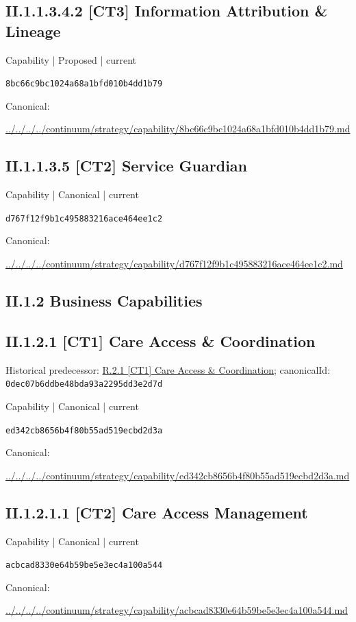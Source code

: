 \documentclass[10pt,a4paper]{article}
\begin{document}
\subsection*{II.1.1.3.4.2 [CT3] Information Attribution \& Lineage}
\label{element-8bc66c9bc1024a68a1bfd010b4dd1b79}
{\small Capability | Proposed | current}\par
\texttt{8bc66c9bc1024a68a1bfd010b4dd1b79}\par
Canonical: \par
{\footnotesize\url{../../../../continuum/strategy/capability/8bc66c9bc1024a68a1bfd010b4dd1b79.md}}\par
\subsection*{II.1.1.3.5 [CT2] Service Guardian}
\label{element-d767f12f9b1c495883216ace464ee1c2}
{\small Capability | Canonical | current}\par
\texttt{d767f12f9b1c495883216ace464ee1c2}\par
Canonical: \par
{\footnotesize\url{../../../../continuum/strategy/capability/d767f12f9b1c495883216ace464ee1c2.md}}\par
\subsection*{II.1.2 Business Capabilities}
\subsection*{II.1.2.1 [CT1] Care Access \& Coordination}
Historical predecessor: \hyperref[element-0dec07b6ddbe48bda93a2295dd3e2d7d]{R.2.1 [CT1] Care Access \& Coordination}; canonicalId: \texttt{0dec07b6ddbe48bda93a2295dd3e2d7d}\par
\label{element-ed342cb8656b4f80b55ad519ecbd2d3a}
{\small Capability | Canonical | current}\par
\texttt{ed342cb8656b4f80b55ad519ecbd2d3a}\par
Canonical: \par
{\footnotesize\url{../../../../continuum/strategy/capability/ed342cb8656b4f80b55ad519ecbd2d3a.md}}\par
\subsection*{II.1.2.1.1 [CT2] Care Access Management}
\label{element-acbcad8330e64b59be5e3ec4a100a544}
{\small Capability | Canonical | current}\par
\texttt{acbcad8330e64b59be5e3ec4a100a544}\par
Canonical: \par
{\footnotesize\url{../../../../continuum/strategy/capability/acbcad8330e64b59be5e3ec4a100a544.md}}\par
\end{document}
